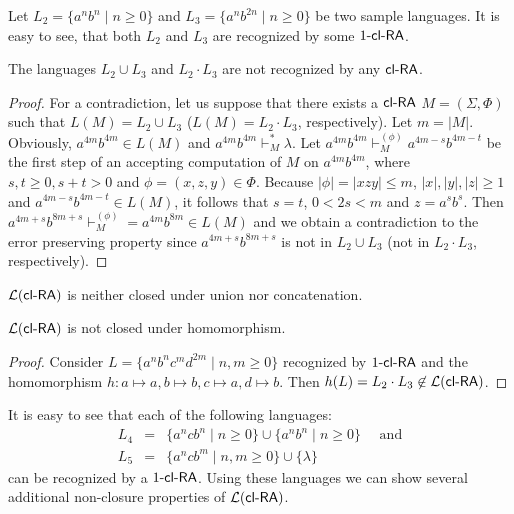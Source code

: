 Let $L_2 = \{a^nb^n \mid n\ge 0\}$ and $L_3 = \{a^nb^{2n} \mid n \ge 0\}$ be two sample languages. It is easy to see, that both $L_2$ and $L_3$ are recognized by some $\kclRA[1]$.

\begin{theorem}\label{theorem:L_2_L_3}
The languages $L_2 \cup L_3$ and $L_2 \cdot L_3$ are not recognized by any $\clRA$.
\end{theorem}

\begin{proof}
For a contradiction, let us suppose that there exists a $\clRA$ $M = (\Sigma,\Phi)$ such that $L(M) = L_2 \cup L_3$ ($L(M) = L_2 \cdot L_3$, respectively). Let $m = |M|$. Obviously, $a^{4m} b^{4m} \in L(M)$ and $a^{4m} b^{4m} \vdash_M^* \lambda$. Let $a^{4m} b^{4m} \vdash_M^{(\phi)} a^{4m-s} b^{4m-t}$ be the first step of an accepting computation of $M$ on $a^{4m} b^{4m}$, where $s, t \ge 0, s+t > 0$ and $\phi = (x, z, y) \in \Phi$. Because $|\phi| = |xzy| \le m$, $|x|, |y|, |z| \ge 1$ and $a^{4m-s} b^{4m-t} \in L(M)$, it follows that $s = t$, $0 < 2s < m$ and $z = a^sb^s$. Then $a^{4m+s} b^{8m+s} \vdash_M^{(\phi)} = a^{4m} b^{8m} \in L(M)$ and we obtain a contradiction to the error preserving property since $a^{4m+s} b^{8m+s}$ is not in $L_2 \cup L_3$ (not in $L_2 \cdot L_3$, respectively).
\end{proof}

\begin{corollary}
$\calL{\clRA}$ is neither closed under union nor concatenation.
\end{corollary}

\begin{corollary}
$\calL{\clRA}$ is not closed under homomorphism.
\end{corollary}

\begin{proof}
Consider $L = \{ a^n b^n c^m d^{2m} \mid n, m \ge 0 \}$ recognized by $\kclRA[1]$ and the homomorphism $h: a \mapsto a, b \mapsto b, c \mapsto a, d \mapsto b$. Then $h(L) = L_2 \cdot L_3 \not\in \calL{\clRA}$.
\end{proof}

It is easy to see that each of the following languages:
    \begin{eqnarray*}
        L_4 & = & \{a^ncb^n \mid n \ge 0\} \cup \{a^nb^n \mid n \ge 0\}\quad \mbox{ and} \\
        L_5 & = & \{a^ncb^m \mid n, m \ge 0\} \cup \{\lambda\}
    \end{eqnarray*}
can be recognized by a $\kclRA[1]$. Using these languages we can show several additional non-closure properties of $\calL{\clRA}$.

